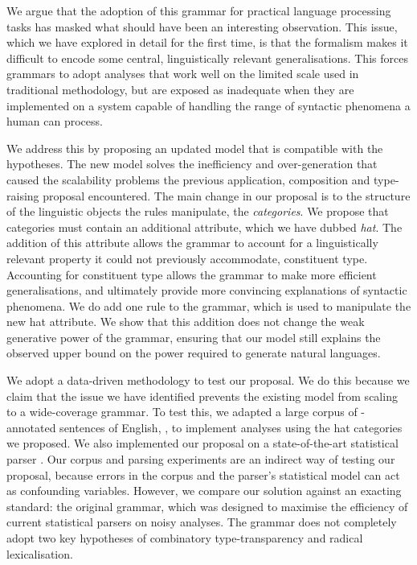 We argue that the adoption of this grammar for practical \ccg language
processing tasks has masked what should have been an interesting observation. This
issue, which we have explored in detail for the first time, is that the \ccg
formalism makes it difficult to encode some central, linguistically relevant
generalisations. This forces \ccg grammars to
adopt analyses that work well on the limited scale used in traditional methodology,
but are exposed as inadequate when they are implemented on a system capable of
handling the range of syntactic phenomena a human can process.

We address this by proposing an
updated model that is compatible with the \ccg hypotheses. The new model solves
the inefficiency and over-generation that caused the scalability problems the
previous application, composition and type-raising proposal encountered. The
main change in our proposal is to the structure of the linguistic objects the
\ccg rules manipulate, the \emph{categories}. We propose that \ccg categories
must contain an additional attribute, which we have dubbed \emph{hat}. The
addition of this attribute allows the grammar to account for a linguistically
relevant property it could not previously accommodate, constituent type.
Accounting for constituent type allows the grammar to make more efficient
generalisations, and ultimately provide more convincing explanations of
syntactic phenomena. We do add one rule to the grammar, which is used to
manipulate the new hat attribute. We show that this addition does not change the
weak generative power of the grammar, ensuring that our model still explains the
observed upper bound on the power required to generate natural languages.

We adopt a data-driven methodology to test our proposal. We do this because we
claim that the issue we have identified prevents the existing model from scaling
to a wide-coverage grammar. To test this, we adapted a large corpus of
\ccg-annotated sentences of English, \ccgbank \citep{hock:cl07}, to implement
analyses using the hat categories we proposed. We also implemented our
proposal on a state-of-the-art statistical parser \citep{clark:cl07}. Our corpus
and parsing experiments are an indirect way of testing our proposal, because
errors in the corpus and the parser's statistical model can act as
confounding variables. However, we compare our solution against an exacting
standard: the original \ccgbank grammar, which was designed to maximise the
efficiency of current statistical parsers on noisy analyses. The \ccgbank
grammar does not completely adopt two key \ccg hypotheses of combinatory
type-transparency and radical lexicalisation.

